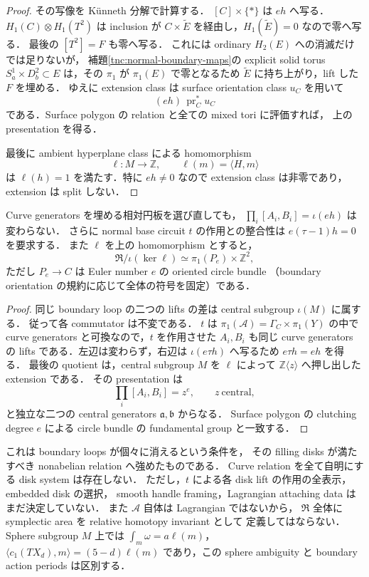 \begin{proof}
その写像を K\"unneth 分解で計算する．
$[C]\times\{*\}$ は $e h$ へ写る．
$H_1(C)\otimes H_1(T^2)$ は inclusion が
$C\times\widetilde E$ を経由し，$H_1(\widetilde E)=0$ なので零へ写る．
最後の $[T^2]=F$ も零へ写る．
これには ordinary $H_2(E)$ への消滅だけでは足りないが，
補題\ref{tnc:normal-boundary-maps}の explicit solid torus
$S^1_a\times D^2_b\subset E$ は，その $\pi_1$ が $\pi_1(E)$ で零となるため
$\widetilde E$ に持ち上がり，lift した $F$ を埋める．
ゆえに extension class は surface orientation class $u_C$ を用いて
\[
 (e h)\,\operatorname{pr}_C^*u_C
\]
である．Surface polygon の relation と全ての mixed tori に評価すれば，
上の presentation を得る．

最後に ambient hyperplane class による homomorphism
\[
 \ell:M\longrightarrow\mathbb Z,\qquad
 \ell(m)=\langle H,m\rangle
\]
は $\ell(h)=1$ を満たす．特に $e h\ne0$ なので extension class は非零であり，
extension は split しない．
\end{proof}

\begin{corollary}
\label{tnc:relative-disk-degree}
Curve generators を埋める相対円板を選び直しても，
$\prod_i[A_i,B_i]=\iota(e h)$ は変わらない．
さらに normal base circuit $t$ の作用との整合性は
$e(\tau-1)h=0$ を要求する．
また $\ell$ を上の homomorphism とすると，
\[
 \mathfrak R/\iota(\ker\ell)
   \simeq\pi_1(P_e)\times\mathbb Z^2,
\]
ただし $P_e\to C$ は Euler number $e$ の oriented circle bundle
（boundary orientation の規約に応じて全体の符号を固定）である．
\end{corollary}
\begin{proof}
同じ boundary loop の二つの lifts の差は central subgroup $\iota(M)$ に属する．
従って各 commutator は不変である．
$t$ は $\pi_1(\mathcal A)=\Gamma_C\times\pi_1(Y)$ の中で
curve generators と可換なので，$t$ を作用させた $A_i,B_i$ も同じ
curve generators の lifts である．左辺は変わらず，右辺は
$\iota(e\tau h)$ へ写るため $e\tau h=e h$ を得る．
最後の quotient は，central subgroup $M$ を $\ell$ によって
$\mathbb Z\langle z\rangle$ へ押し出した extension である．
その presentation は
\[
 \prod_i[A_i,B_i]=z^e,
 \qquad z\ \text{central},
\]
と独立な二つの central generators $\mathfrak a,\mathfrak b$ からなる．
Surface polygon の clutching degree $e$ による circle bundle の
fundamental group と一致する．
\end{proof}

\begin{remark}[相対円板計算の範囲]
これは boundary loops が個々に消えるという条件を，
その filling disks が満たすべき nonabelian relation へ強めたものである．
Curve relation を全て自明にする disk system は存在しない．
ただし，$t$ による各 disk lift の作用の全表示，embedded disk の選択，
smooth handle framing，Lagrangian attaching data はまだ決定していない．
また $\mathcal A$ 自体は Lagrangian ではないから，
$\mathfrak R$ 全体に symplectic area を relative homotopy invariant として
定義してはならない．Sphere subgroup $M$ 上では
$\int_m\omega=a\ell(m)$，$\langle c_1(TX_d),m\rangle=(5-d)\ell(m)$
であり，この sphere ambiguity と boundary action periods は区別する．
\end{remark}

